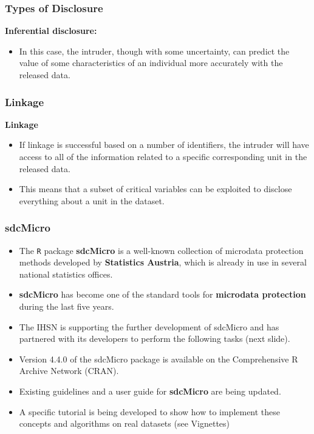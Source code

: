 \documentclass{beamer}
\begin{document}
\begin{frame}
	\frametitle{Types of Disclosure}
\textbf{Inferential disclosure:}
\begin{itemize}
	
	\item In this case, the intruder, though with some uncertainty,
	can predict the value of some characteristics of an individual more accurately with the released data.
\end{itemize}
\end{frame}
\begin{frame}
\frametitle{Linkage}
\textbf{Linkage}
\begin{itemize}
	
\item If linkage is successful based on a number of identifiers, the intruder will have
	access to all of the information related to a specific corresponding unit in the
	released data. 
\item This means that a subset of critical variables can be exploited to
	disclose everything about a unit in the dataset.
\end{itemize}

\end{frame}
	\begin{frame}
		\frametitle{sdcMicro}
		\begin{itemize}
			\item The \texttt{R} package \textbf{sdcMicro} is a well-known collection of microdata protection methods developed by \textbf{Statistics Austria}, which is already in use in several national statistics offices. 
			\item \textbf{sdcMicro} has become one of the standard tools for \textbf{microdata protection} during the last five years.
			\item The IHSN is supporting the further development of sdcMicro and has partnered with its developers to perform the following tasks (next slide).
		\end{itemize}
	\end{frame}
	\begin{frame}
		\begin{itemize}
			\item Version 4.4.0 of the sdcMicro package is available on the Comprehensive R Archive Network (CRAN).
			\item Existing guidelines and a user guide for \textbf{sdcMicro} are being updated. 
			\item A specific tutorial is being developed to show how to implement these concepts and algorithms on real datasets (see 
			Vignettes)
		\end{itemize}
		
		
	\end{frame}
\end{document}
